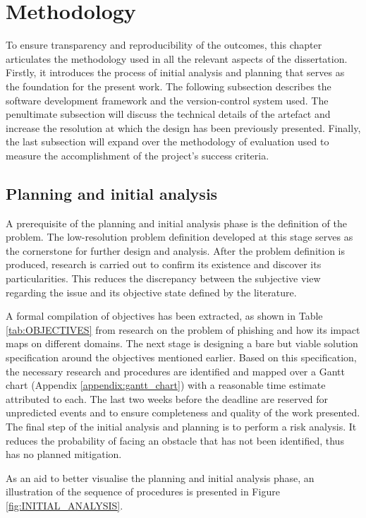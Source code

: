 \chapter{Methodology}
\label{chap:methodology}

To ensure transparency and reproducibility of the outcomes, this chapter articulates the methodology used in all the relevant aspects of the dissertation.
Firstly, it introduces the process of initial analysis and planning that serves as the foundation for the present work. The following subsection describes the software development framework and the version-control system used. The penultimate subsection will discuss the technical details of the artefact and increase the resolution at which the design has been previously presented. Finally, the last subsection will expand over the methodology of evaluation used to measure the accomplishment of the project's success criteria.

\section{Planning and initial analysis}
A prerequisite of the planning and initial analysis phase is the definition of the problem. The low-resolution problem definition developed at this stage serves as the cornerstone for further design and analysis. After the problem definition is produced, research is carried out to confirm its existence and discover its particularities. This reduces the discrepancy between the subjective view regarding the issue and its objective state defined by the literature.

A formal compilation of objectives has been extracted, as shown in Table \ref{tab:OBJECTIVES} from research on the problem of phishing and how its impact maps on different domains. The next stage is designing a bare but viable solution specification around the objectives mentioned earlier. Based on this specification, the necessary research and procedures are identified and mapped over a Gantt chart (Appendix \ref{appendix:gantt_chart}) with a reasonable time estimate attributed to each. The last two weeks before the deadline are reserved for unpredicted events and to ensure completeness and quality of the work presented. The final step of the initial analysis and planning is to perform a risk analysis. It reduces the probability of facing an obstacle that has not been identified, thus has no planned mitigation.

As an aid to better visualise the planning and initial analysis phase, an illustration of the sequence of procedures is presented in Figure \ref{fig:INITIAL_ANALYSIS}.


